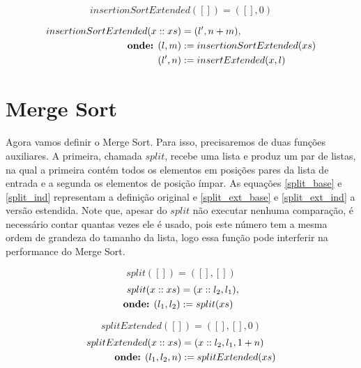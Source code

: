 \documentclass[12pt, oneside, a4paper,english,brazil]{abntex2}
\begin{document}
\begin{equation} \label{ins_sort_ext_base}
insertionSortExtended([]) = ([], 0)
\end{equation}


\begin{equation}\label{ins_sort_ext_ind}
\begin{split}
  insertionSortExtended(x :: xs) &= (l', n + m),\\
  \text{\textbf{onde:} }(l, m) &:= insertionSortExtended(xs)\\
  \text{\quad} (l', n) &:= insertExtended(x, l)
\end{split}
\end{equation}

\section{Merge Sort}
\qquad Agora vamos definir o Merge Sort. Para isso, precisaremos de duas fun\c{c}\~oes
auxiliares. A primeira, chamada $split$, recebe uma lista e produz um par de listas,
na qual a primeira cont\'em todos os elementos em posi\c{c}\~oes pares da lista de entrada
e a segunda os elementos de posi\c{c}\~ao \'impar. As equa\c{c}\~oes \ref{split_base} e \ref{split_ind}
representam a defini\c{c}\~ao original e \ref{split_ext_base} e \ref{split_ext_ind} a vers\~ao estendida.
Note que, apesar do $split$ n\~ao executar nenhuma compara\c{c}\~ao, \'e necess\'ario contar quantas vezes
ele \'e usado, pois este n\'umero tem a mesma ordem de grandeza do tamanho da lista, logo essa fun\c{c}\~ao
pode interferir na performance do Merge Sort.

\begin{equation}\label{split_base}
split([]) = ([], [])
\end{equation}
\begin{equation}
\begin{split}\label{split_ind}
  split(x :: xs) &= (x :: l_{2}, l_{1}),\\
  \text{\textbf{onde:} } (l_{1}, l_{2}) &:= split(xs)
\end{split}
\end{equation}

\begin{equation}\label{split_ext_base}
  splitExtended([]) = ([], [], 0)
\end{equation}
\begin{equation}\label{split_ext_ind}
\begin{split}
  splitExtended(x :: xs) &= (x :: l_{2}, l_{1}, 1 + n)\\
  \text{\textbf{onde:} } (l_{1}, l_{2}, n) &:= splitExtended(xs)
\end{split}
\end{equation}
\end{document}
